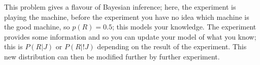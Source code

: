\documentclass[12pt]{article}
\begin{document}
This problem gives a flavour of Bayesian inference; here, the
experiment is playing the machine, before the experiment you have no
idea which machine is the good machine, so $p(R)=0.5$; this models
your knowledge. The experiment provides some information and so you
can update your model of what you know; this is $P(R|J)$ or $P(R|!J)$
depending on the result of the experiment. This new distribution can
then be modified further by further experiment.
\end{document}
